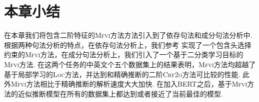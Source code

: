 \section{本章小结}

在本章我们将包含二阶特征的\textsc{Mfvi}方法方法引入到了依存句法和成分句法分析中.
根据两种句法分析的特点，在依存句法分析上，我们参考 \citep{wang-tu-2020-second}实现了一个包含头选择约束的\textsc{Mfvi}方法，在成分句法分析上，我们引入了一个基于二分类学习目标的\textsc{Mfvi}方法.
在这两个任务的中英文个五个数据集上的结果表明，\textsc{Mfvi}方法均超越了基于局部学习的\textsc{Loc}方法，并达到和精确推断的二阶\textsc{Crf2o}方法可比较的性能.
此外\textsc{Mfvi}方法相比于精确推断的解析速度大大加快.
在加入BERT之后，基于\textsc{Mfvi}方法的近似推断模型在所有的数据集上都达到或者接近了当前最佳的模型.